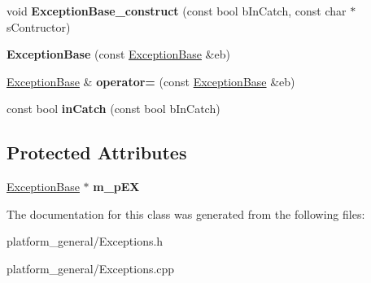 \begin{DoxyCompactItemize}
\item 
\hypertarget{classgeneral__server_1_1ExceptionBase_a4b2b1a970a8ba3acbef301ebff2f17b3}{void {\bfseries \-Exception\-Base\-\_\-construct} (const bool b\-In\-Catch, const char $\ast$s\-Contructor)}\label{classgeneral__server_1_1ExceptionBase_a4b2b1a970a8ba3acbef301ebff2f17b3}

\item 
\hypertarget{classgeneral__server_1_1ExceptionBase_af322d346dd9a35df346cd960cee7da6e}{{\bfseries \-Exception\-Base} (const \hyperlink{classgeneral__server_1_1ExceptionBase}{\-Exception\-Base} \&eb)}\label{classgeneral__server_1_1ExceptionBase_af322d346dd9a35df346cd960cee7da6e}

\item 
\hypertarget{classgeneral__server_1_1ExceptionBase_a597e5c3f206621e0713d889ca10c0723}{\hyperlink{classgeneral__server_1_1ExceptionBase}{\-Exception\-Base} \& {\bfseries operator=} (const \hyperlink{classgeneral__server_1_1ExceptionBase}{\-Exception\-Base} \&eb)}\label{classgeneral__server_1_1ExceptionBase_a597e5c3f206621e0713d889ca10c0723}

\item 
\hypertarget{classgeneral__server_1_1ExceptionBase_acaa334a0a8dce2d2858973b3a62deea8}{const bool {\bfseries in\-Catch} (const bool b\-In\-Catch)}\label{classgeneral__server_1_1ExceptionBase_acaa334a0a8dce2d2858973b3a62deea8}

\end{DoxyCompactItemize}
\subsection*{\-Protected \-Attributes}
\begin{DoxyCompactItemize}
\item 
\hypertarget{classgeneral__server_1_1ExceptionBase_aab764f7ca0616f0c480921e92d489bc1}{\hyperlink{classgeneral__server_1_1ExceptionBase}{\-Exception\-Base} $\ast$ {\bfseries m\-\_\-p\-E\-X}}\label{classgeneral__server_1_1ExceptionBase_aab764f7ca0616f0c480921e92d489bc1}

\end{DoxyCompactItemize}


\-The documentation for this class was generated from the following files\-:\begin{DoxyCompactItemize}
\item 
platform\-\_\-general/\-Exceptions.\-h\item 
platform\-\_\-general/\-Exceptions.\-cpp\end{DoxyCompactItemize}

